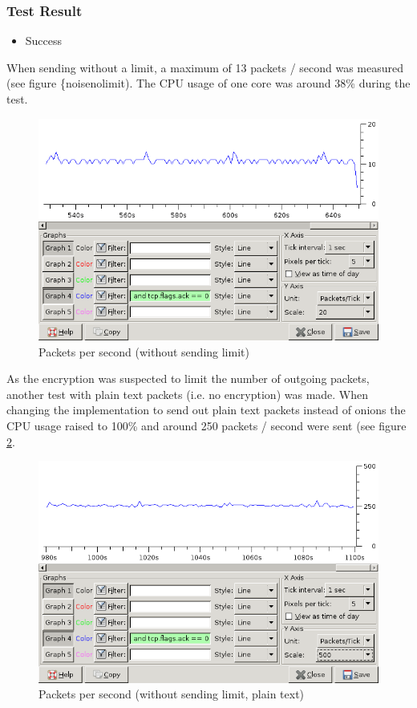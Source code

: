 \subsubsection{Test Result}
\begin{itemize}
\item Success
\end{itemize}
When sending without a limit, a maximum of 13 packets / second
was measured (see figure \{noisenolimit). The CPU
usage of one core was around 38\% during the test.
\begin{figure}[htbp]
\caption{Packets per second (without sending limit)}
\label{noisenolimit}
\centering
\includegraphics[scale=0.5]{noise-no-limit.png}
\end{figure}
As the encryption was suspected to limit the number
of outgoing packets, another test with plain text
packets (i.e. no encryption) was made.
When changing the implementation to send out 
plain text packets instead of onions the
CPU usage raised to 100\% and
around 250 packets / second were sent (see figure
\ref{noisenolimitplain}.
\begin{figure}[htbp]
\caption{Packets per second (without sending limit, plain text)}
\label{noisenolimitplain}
\centering
\includegraphics[scale=0.5]{noise-plain-no-limit.png}
\end{figure}
